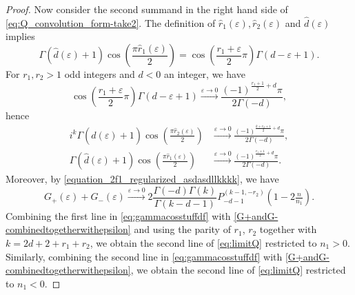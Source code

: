\documentclass[]{article}
\begin{document}
\begin{proof}
Now consider the second summand in the right hand side of \eqref{eq:Q_convolution_form-take2}. The definition of $\hat r_1(\varepsilon), \hat r_2(\varepsilon)$ and $\hat d(\varepsilon)$ implies  
\begin{equation}\label{eq:gammacosstuff}
    \Gamma (\hat d(\varepsilon)+1) \cos \left(\frac{\pi  \hat r_1(\varepsilon) }{2}\right) = \cos \left(\frac{r_1+\varepsilon}{2} \pi  \right) \Gamma \left(d-\varepsilon +1\right).
\end{equation}
For $r_1,r_2>1$ odd integers and $d<0 $ an integer, we have %
\begin{equation}
    \cos \left(\frac{r_1+\varepsilon}{2} \pi  \right) \Gamma \left(d-\varepsilon +1\right) \stackrel{ \varepsilon \to 0 }{\to}  \frac{ (-1)^{\frac{r_1+1}{2}+d} \pi   }{2\Gamma(-d)},
\end{equation}
hence 
\begin{equation}\label{eq:gammacosstuffdf}
\begin{split}
    i^k \Gamma (\hat d(\varepsilon)+1) \cos \left(\frac{\pi  \hat r_2(\varepsilon) }{2}\right) & \stackrel{ \varepsilon \to 0 }{\to}   \frac{ (-1)^{\frac{k+r_2+1}{2}+d} \pi   }{2\Gamma(-d)},\\
    \Gamma (\hat d(\varepsilon)+1) \cos \left(\frac{\pi  \hat r_1(\varepsilon) }{2}\right) & \stackrel{ \varepsilon \to 0 }{\to}   \frac{ (-1)^{\frac{r_1+1}{2}+d} \pi   }{2\Gamma(-d)}.
\end{split}
\end{equation}
Moreover, by \eqref{equation_2f1_regularized_asdasdllkkkk}, we have 
\begin{equation}\label{G+andG-combinedtogetherwithepsilon}
    G_+(\varepsilon) + G_- (\varepsilon)\stackrel{\varepsilon \to 0}{\to} 2 \frac{\Gamma(-d) \Gamma(k)}{ \Gamma(k-d-1) } P^{  (k-1, -r_2) }_{-d-1} (1-2 \tfrac{n}{n_1}).
\end{equation}
Combining the first line in \eqref{eq:gammacosstuffdf} with  \eqref{G+andG-combinedtogetherwithepsilon} and using the parity of $r_1$, $r_2$ together with $k=2d+2+r_1+r_2$, we obtain the second line of \eqref{eq:limitQ} restricted to $n_1>0$. Similarly, combining the second line in \eqref{eq:gammacosstuffdf} with  \eqref{G+andG-combinedtogetherwithepsilon}, we obtain the second line of \eqref{eq:limitQ} restricted to $n_1<0$. 



\end{proof}
\end{document}
